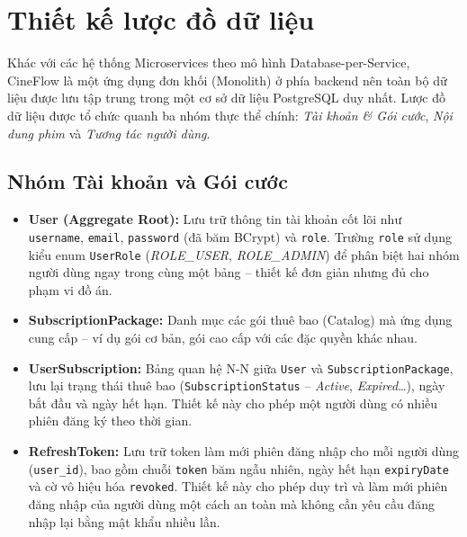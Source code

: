 \section{Thiết kế lược đồ dữ liệu}
\label{sec:luoc_do_du_lieu}

Khác với các hệ thống Microservices theo mô hình Database-per-Service, CineFlow là
một ứng dụng đơn khối (Monolith) ở phía backend nên toàn bộ dữ liệu được lưu tập
trung trong một cơ sở dữ liệu PostgreSQL duy nhất. Lược đồ dữ liệu được tổ chức quanh
ba nhóm thực thể chính: \textit{Tài khoản \& Gói cước}, \textit{Nội dung phim} và
\textit{Tương tác người dùng}.

\subsection{Nhóm Tài khoản và Gói cước}

\begin{itemize}
  \item \textbf{User (Aggregate Root):} Lưu trữ thông tin tài khoản cốt lõi như
  \texttt{username}, \texttt{email}, \texttt{password} (đã băm BCrypt) và
  \texttt{role}. Trường \texttt{role} sử dụng kiểu enum \texttt{UserRole}
  (\textit{ROLE\_USER}, \textit{ROLE\_ADMIN}) để phân biệt hai nhóm người dùng ngay
  trong cùng một bảng -- thiết kế đơn giản nhưng đủ cho phạm vi đồ án.

  \item \textbf{SubscriptionPackage:} Danh mục các gói thuê bao (Catalog) mà ứng
  dụng cung cấp -- ví dụ gói cơ bản, gói cao cấp với các đặc quyền khác nhau.

  \item \textbf{UserSubscription:} Bảng quan hệ N-N giữa \texttt{User} và
  \texttt{SubscriptionPackage}, lưu lại trạng thái thuê bao (\texttt{SubscriptionStatus}
  -- \textit{Active}, \textit{Expired}\dots), ngày bắt đầu và ngày hết hạn. Thiết
  kế này cho phép một người dùng có nhiều phiên đăng ký theo thời gian.

  \item \textbf{RefreshToken:} Lưu trữ token làm mới phiên đăng nhập cho mỗi người
  dùng (\texttt{user\_id}), bao gồm chuỗi \texttt{token} băm ngẫu nhiên, ngày hết hạn
  \texttt{expiryDate} và cờ vô hiệu hóa \texttt{revoked}. Thiết kế này cho phép duy trì
  và làm mới phiên đăng nhập của người dùng một cách an toàn mà không cần yêu cầu đăng
  nhập lại bằng mật khẩu nhiều lần.
\end{itemize}

